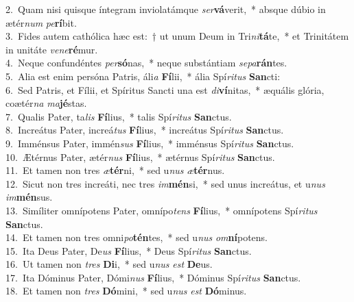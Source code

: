 {2.~}Quam nisi quisque íntegram inviolatámque \textit{ser}\textbf{vá}verit,~* absque dúbio in ætér\textit{num} \textit{pe}\textbf{rí}bit.\\
{3.~}Fides autem cathólica hæc est:~† ut unum Deum in Tri\textit{ni}\textbf{tá}te,~* et Trinitátem in unitáte \textit{ve}\textit{ne}\textbf{ré}mur.\\
{4.~}Neque confundéntes \textit{per}\textbf{só}nas,~* neque substántiam \textit{se}\textit{pa}\textbf{rán}tes.\\
{5.~}Alia est enim persóna Patris, áli\textit{a} \textbf{Fí}lii,~* ália Spí\textit{ri}\textit{tus} \textbf{San}cti:\\
{6.~}Sed Patris, et Fílii, et Spíritus Sancti una est \textit{di}\textbf{ví}nitas,~* æquális glória, coætér\textit{na} \textit{ma}\textbf{jé}stas.\\
{7.~}Qualis Pater, ta\textit{lis} \textbf{Fí}lius,~* talis Spí\textit{ri}\textit{tus} \textbf{San}ctus.\\
{8.~}Increátus Pater, increá\textit{tus} \textbf{Fí}lius,~* increátus Spí\textit{ri}\textit{tus} \textbf{San}ctus.\\
{9.~}Imménsus Pater, immén\textit{sus} \textbf{Fí}lius,~* imménsus Spí\textit{ri}\textit{tus} \textbf{San}ctus.\\
{10.~}Ætérnus Pater, ætér\textit{nus} \textbf{Fí}lius,~* ætérnus Spí\textit{ri}\textit{tus} \textbf{San}ctus.\\
{11.~}Et tamen non tres \textit{æ}\textbf{tér}ni,~* sed u\textit{nus} \textit{æ}\textbf{tér}nus.\\
{12.~}Sicut non tres increáti, nec tres \textit{im}\textbf{mén}si,~* sed unus increátus, et u\textit{nus} \textit{im}\textbf{mén}sus.\\
{13.~}Simíliter omnípotens Pater, omnípo\textit{tens} \textbf{Fí}lius,~* omnípotens Spí\textit{ri}\textit{tus} \textbf{San}ctus.\\
{14.~}Et tamen non tres omni\textit{po}\textbf{tén}tes,~* sed u\textit{nus} \textit{om}\textbf{ní}potens.\\
{15.~}Ita Deus Pater, De\textit{us} \textbf{Fí}lius,~* Deus Spí\textit{ri}\textit{tus} \textbf{San}ctus.\\
{16.~}Ut tamen non \textit{tres} \textbf{Di}i,~* sed u\textit{nus} \textit{est} \textbf{De}us.\\
{17.~}Ita Dóminus Pater, Dómi\textit{nus} \textbf{Fí}lius,~* Dóminus Spí\textit{ri}\textit{tus} \textbf{San}ctus.\\
{18.~}Et tamen non \textit{tres} \textbf{Dó}mini,~* sed u\textit{nus} \textit{est} \textbf{Dó}minus.\\
